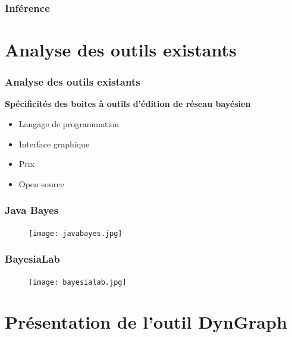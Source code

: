 \documentclass{beamer}
\begin{document}
\begin{frame}
\frametitle{Inférence}
\end{frame}


\section{Analyse des outils existants}

\begin{frame}
\frametitle{Analyse des outils existants}

\textbf{Spécificités des boites à outils d'édition de réseau bayésien}
\begin{itemize}
\item Langage de programmation 
\item Interface graphique 
\item Prix
\item Open source 
\end{itemize}

\end{frame}

\begin{frame}
\frametitle{Java Bayes}

\begin{figure}
\texttt{[image: javabayes.jpg]}
\end{figure}

\end{frame}


\begin{frame}
\frametitle{BayesiaLab}

\begin{figure}
\texttt{[image: bayesialab.jpg]}
\end{figure}

\end{frame}


\section{Présentation de l'outil DynGraph}
\end{document}
